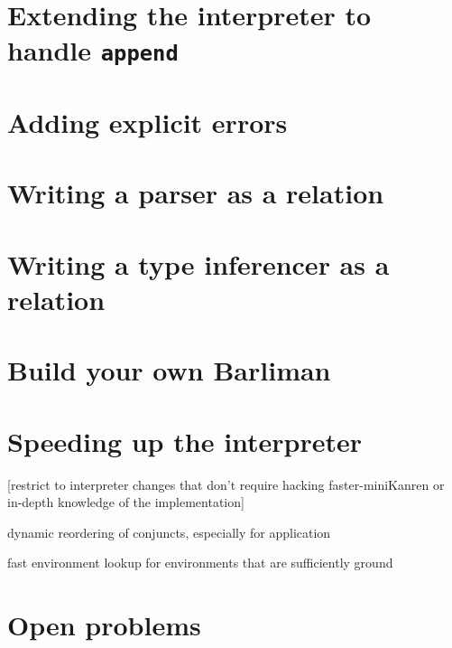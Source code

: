 \documentclass{book}
\begin{document}
\chapter{Extending the interpreter to handle \texttt{append}}%


\chapter{Adding explicit errors}%


\chapter{Writing a parser as a relation}%


\chapter{Writing a type inferencer as a relation}%


\chapter{Build your own Barliman}%


\chapter{Speeding up the interpreter}%

[restrict to interpreter changes that don't require hacking faster-miniKanren or in-depth knowledge of the implementation]

dynamic reordering of conjuncts, especially for application

fast environment lookup for environments that are sufficiently ground


\chapter{Open problems}%


\appendix
\end{document}
